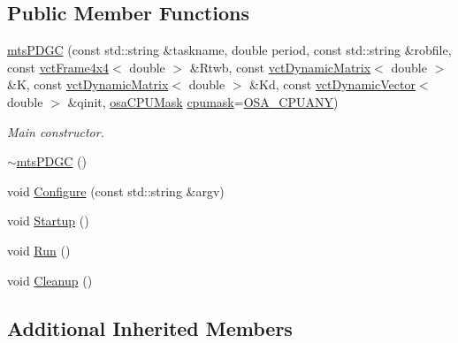 \subsection*{Public Member Functions}
\begin{DoxyCompactItemize}
\item 
\hyperlink{classmts_p_d_g_c_a468cda6c0b0e19dd3fdcd6666a88db79}{mts\-P\-D\-G\-C} (const std\-::string \&taskname, double period, const std\-::string \&robfile, const \hyperlink{classvct_frame4x4}{vct\-Frame4x4}$<$ double $>$ \&Rtwb, const \hyperlink{classvct_dynamic_matrix}{vct\-Dynamic\-Matrix}$<$ double $>$ \&K, const \hyperlink{classvct_dynamic_matrix}{vct\-Dynamic\-Matrix}$<$ double $>$ \&Kd, const \hyperlink{classvct_dynamic_vector}{vct\-Dynamic\-Vector}$<$ double $>$ \&qinit, \hyperlink{osa_c_p_u_affinity_8h_aaec7cdd7797e5e6eb5438c15fee5477a}{osa\-C\-P\-U\-Mask} \hyperlink{classmts_controller_a3125e5e9b65dc2347725215e8af73c9f}{cpumask}=\hyperlink{osa_c_p_u_affinity_8h_a2ae5ea257830cff2814d81ce526ada35}{O\-S\-A\-\_\-\-C\-P\-U\-A\-N\-Y})
\begin{DoxyCompactList}\small\item\em Main constructor. \end{DoxyCompactList}\item 
\hyperlink{classmts_p_d_g_c_adf227449e5ac7d32ebdbaa56b30c9072}{$\sim$mts\-P\-D\-G\-C} ()
\item 
void \hyperlink{classmts_p_d_g_c_a29675ad41f14e32e3c236625b91dfbea}{Configure} (const std\-::string \&argv)
\item 
void \hyperlink{classmts_p_d_g_c_ac14839761b21dcca78e0823b32942b9c}{Startup} ()
\item 
void \hyperlink{classmts_p_d_g_c_a443cbb3ccb3ae69415b22db66d20c466}{Run} ()
\item 
void \hyperlink{classmts_p_d_g_c_abce1b8e375c7996d32e37054cdd3da3d}{Cleanup} ()
\end{DoxyCompactItemize}
\subsection*{Additional Inherited Members}



